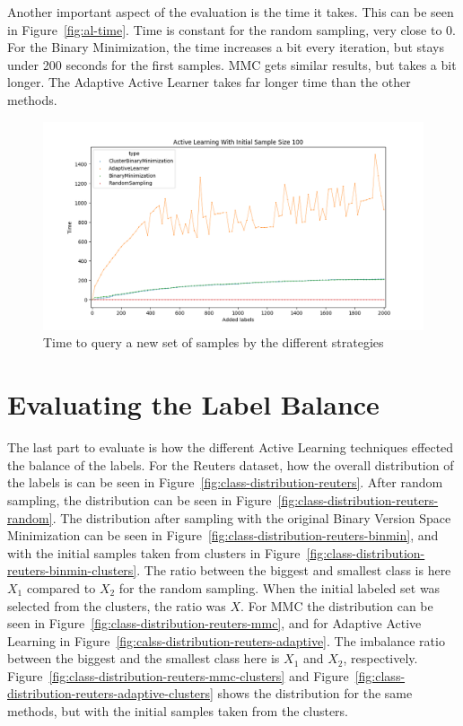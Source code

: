 Another important aspect of the evaluation is the time it takes.
This can be seen in Figure~\ref{fig:al-time}.
Time is constant for the random sampling, very close to 0.
For the Binary Minimization, the time increases a bit every iteration, but stays under 200 seconds for the first samples.
MMC gets similar results, but takes a bit longer.
The Adaptive Active Learner takes far longer time than the other methods.

\begin{figure}
    \centering
    \includegraphics[scale=0.5]{figures/al-time.png}
    \caption{Time to query a new set of samples by the different strategies}
    \label{fig:al-micro-precision-25}
\end{figure}


\section{Evaluating the Label Balance}

The last part to evaluate is how the different Active Learning techniques effected the balance of the labels.
For the Reuters dataset, how the overall distribution of the labels is can be seen in Figure~\ref{fig:class-distribution-reuters}.
After random sampling, the distribution can be seen in Figure~\ref{fig:class-distribution-reuters-random}.
The distribution after sampling with the original Binary Version Space Minimization can be seen in Figure~\ref{fig:class-distribution-reuters-binmin}, and with the initial samples taken from clusters in Figure~\ref{fig:class-distribution-reuters-binmin-clusters}.
The ratio between the biggest and smallest class is here $X_1$ compared to $X_2$ for the random sampling.
When the initial labeled set was selected from the clusters, the ratio was $X$.
For MMC the distribution can be seen in Figure~\ref{fig:class-distribution-reuters-mmc}, and for Adaptive Active Learning in Figure~\ref{fig:calss-distribution-reuters-adaptive}.
The imbalance ratio between the biggest and the smallest class here is $X_1$ and $X_2$, respectively.
Figure~\ref{fig:class-distribution-reuters-mmc-clusters} and Figure~\ref{fig:class-distribution-reuters-adaptive-clusters} shows the distribution for the same methods, but with the initial samples taken from the clusters.

